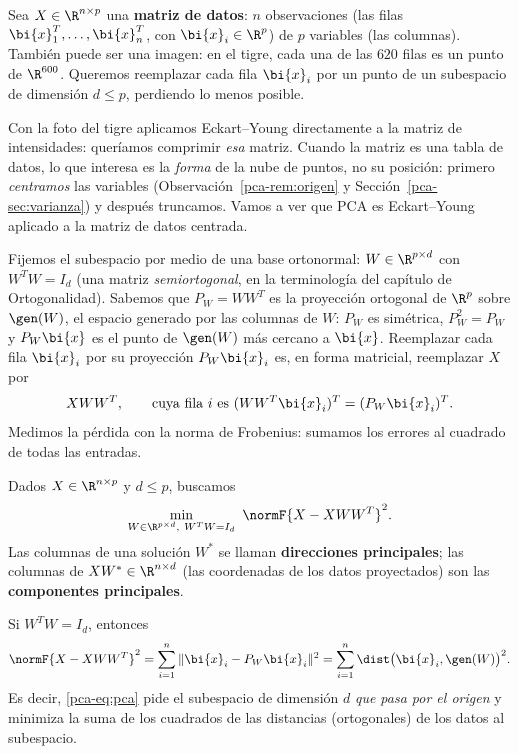 Sea $X\in\R^{n\times p}$ una \textbf{matriz de datos}: $n$ observaciones (las
filas $\bi{x}_1^T,\dots,\bi{x}_n^T$, con $\bi{x}_i\in\R^p$) de $p$ variables (las
columnas). También puede ser una imagen: en el tigre, cada una de las $620$
filas es un punto de $\R^{600}$. Queremos reemplazar cada fila $\bi{x}_i$ por un
punto de un subespacio de dimensión $d\le p$, perdiendo lo menos posible.

\begin{remark}\label{pca-rem:svd-vs-pca}
Con la foto del tigre aplicamos Eckart--Young directamente a la matriz de
intensidades: queríamos comprimir \emph{esa} matriz. Cuando la matriz es una
tabla de datos, lo que interesa es la \emph{forma} de la nube de puntos, no su
posición: primero \emph{centramos} las variables
(Observación~\ref{pca-rem:origen} y Sección~\ref{pca-sec:varianza}) y después
truncamos. Vamos a ver que PCA es Eckart--Young aplicado a la matriz de datos
centrada.
\end{remark}

Fijemos el subespacio por medio de una base ortonormal: $W\in\R^{p\times d}$
con $W^T W=I_d$ (una matriz \emph{semiortogonal}, en la terminología del
capítulo de Ortogonalidad). Sabemos que $P_W=WW^T$ es la proyección
ortogonal de $\R^p$ sobre $\gen(W)$, el espacio generado por las columnas de
$W$: $P_W$ es simétrica, $P_W^2=P_W$ y $P_W \bi{x}$ es el punto de $\gen(W)$ más
cercano a $\bi{x}$. Reemplazar cada fila $\bi{x}_i$ por su proyección $P_W\bi{x}_i$ es, en
forma matricial, reemplazar $X$ por
\[
XWW^T,\qquad\text{cuya fila $i$ es }(WW^T \bi{x}_i)^T=(P_W\bi{x}_i)^T .
\]
Medimos la pérdida con la norma de Frobenius: sumamos los errores al cuadrado
de todas las entradas.

\begin{definition}\label{pca-def:pca}
Dados $X\in\R^{n\times p}$ y $d\le p$, buscamos
\begin{equation}\label{pca-eq:pca}
\min_{W\in\R^{p\times d},\ W^T W=I_d}\ \normF{X-XWW^T}^2 .
\end{equation}
Las columnas de una solución $W^\ast$ se llaman \textbf{direcciones
principales}; las columnas de $XW^\ast\in\R^{n\times d}$ (las coordenadas de
los datos proyectados) son las \textbf{componentes principales}.
\end{definition}

\begin{proposition}\label{pca-prop:distancias}
Si $W^T W=I_d$, entonces
\[
\normF{X-XWW^T}^2=\sum_{i=1}^n\|\bi{x}_i-P_W\bi{x}_i\|^2
=\sum_{i=1}^n \dist\bigl(\bi{x}_i,\gen(W)\bigr)^2 .
\]
Es decir, \eqref{pca-eq:pca} pide el subespacio de dimensión $d$ \emph{que pasa
por el origen} y minimiza la suma de los cuadrados de las distancias
(ortogonales) de los datos al subespacio.
\end{proposition}


